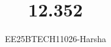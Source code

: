 \documentclass[journal]{IEEEtran}
\begin{document}

\vspace{3cm}

\title{12.352}
\author{EE25BTECH11026-Harsha}
 \maketitle
{\let\newpage\relax\maketitle}

\renewcommand{\thefigure}{\theenumi}
\renewcommand{\thetable}{\theenumi}
\setlength{\intextsep}{10pt} %


\renewcommand{\thetable}{\theenumi}
\end{document}

